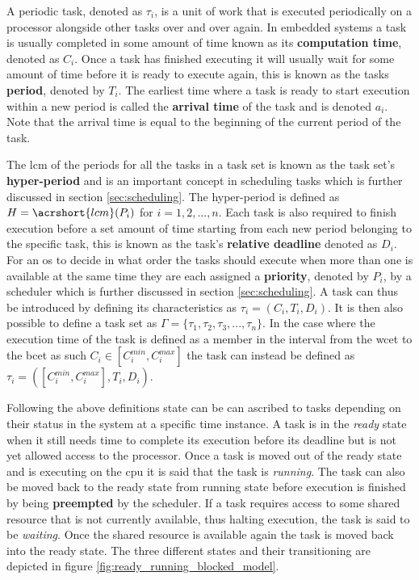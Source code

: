 \documentclass{kththesis}
\begin{document}
A periodic task, denoted as $\tau_i$, is a unit of work that is executed periodically on a processor
alongside other tasks over and over again. In embedded systems a task is usually completed in some
amount of time known as its \textbf{computation time}, denoted as $C_i$. Once a task has finished
executing it will usually wait for some amount of time before it is ready to execute again, this is
known as the tasks \textbf{period}, denoted by $T_i$. The earliest time where a task is ready to
start execution within a new period is called the \textbf{arrival time} of the task and is denoted $
a_i $. Note that the arrival time is equal to the beginning of the current period of the task.

The \acrshort{lcm} of the periods for all the tasks in a task set is known as the task set's
\textbf{hyper-period} and is an important concept in scheduling tasks which is further discussed
in section \ref{sec:scheduling}. The hyper-period is defined as $H = \acrshort{lcm}(P_i)$ for $i =
1, 2, ..., n$. Each task is also required to finish execution before a set amount of time starting
from each new period belonging to the specific task, this is known as the task's \textbf{relative
deadline} denoted as $D_i$. For an \acrshort{os} to decide in what order the tasks should execute
when more than one is available at the same time they are each assigned a \textbf{priority}, denoted
by $P_i$, by a scheduler which is further discussed in section \ref{sec:scheduling}. A task can thus
be introduced by defining its characteristics as $\tau_i = (C_i, T_i, D_i)$. It is then also possible to
define a task set as $ \Gamma = \{\tau_1, \tau_2, \tau_3, ..., \tau_n\} $. In the case where the
execution time of the task is defined as a member in the interval from the \acrshort{wcet} to the
\acrshort{bcet} as such $C_i \in [C_i^{min}, C_i^{max}]$ the task can instead be defined as $\tau_i
= ([C_i^{min}, C_i^{max}], T_i, D_i)$.

Following the above definitions state can be can ascribed to tasks depending on their status in the
system at a specific time instance. A task is in the \textit{ready} state when it still needs time
to complete its execution before its deadline but is not yet allowed access to the processor. Once a
task is moved out of the ready state and is executing on the \acrshort{cpu} it is said that the task
is \textit{running}. The task can also be moved back to the ready state from running state before
execution is finished by being \textbf{preempted} by the scheduler. If a task requires access to
some shared resource that is not currently available, thus halting execution, the task is said to be
\textit{waiting}. Once the shared resource is available again the task is moved back into the ready
state. The three different states and their transitioning are depicted in figure
\ref{fig:ready_running_blocked_model}.
\end{document}
